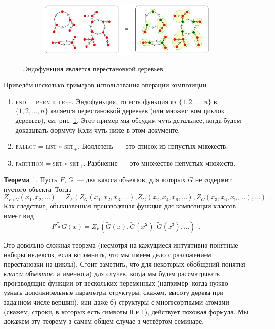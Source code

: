 \documentclass{article}
\theoremstyle{definition}
\newtheorem*{theorem}{Теорема}
\begin{document}
\begin{figure}[h]
\centering
\begin{subfigure}{.8\textwidth}
    \centering
    \includegraphics[width=\textwidth]{par_composition.png}
\end{subfigure}%
\caption{Эндофункция является перестановкой деревьев}
\label{fig:composition}	
\end{figure}

Приведём несколько примеров использования операции композиции.
\begin{enumerate}
    \item \textsc{end} = \textsc{perm} \( \circ \) \textsc{tree}. Эндофункция,
то есть функция из \(
 \{1,2,\ldots, n\}\) в \( \{1,2,\ldots, n\} \) является перестановкой деревьев (или множеством циклов
деревьев), см. рис. \ref{fig:composition}. Этот пример мы обсудим чуть
детальнее, когда будем доказывать формулу Кэли чуть ниже в этом документе.
    \item \textsc{ballot} = \textsc{list} \( \circ \) \textsc{set}$_+$.
Бюллетень~--- это список из непустых множеств.
    \item \textsc{partition} = \textsc{set} \( \circ \) \textsc{set}$_+$.
Разбиение~--- это множество непустых множеств.
\end{enumerate}

\begin{theorem}
	Пусть \( F \), \( G \)~--- два класса объектов, для 
	которых \( G \) не содержит пустого объекта. Тогда
	\[
		Z_{F \circ G}(x_1, x_2, \ldots) = Z_F(
			Z_G(x_1, x_2, x_3, \ldots),
			Z_G(x_2, x_4, x_6, \ldots),
            Z_G(x_3, x_6, x_9, \ldots),
			\ldots
		) \enspace .
	\]
	Как следствие, обыкновенная производящая функция для композиции классов имеет вид
	\[
		\widetilde{F \circ G}(x) = Z_F(\widetilde G(x), \widetilde G(x^2), 
		\widetilde G(x^3), \ldots)
		\enspace .
	\]
\end{theorem}
Это довольно сложная теорема (несмотря на кажущиеся интуитивно понятные наборы
индексов, если вспомнить, что мы имеем дело с разложением перестановки на циклы).
Стоит заметить, что для некоторых обобщений понятия \textit{класса объектов}, а именно
а) для случев, когда мы будем рассматривать производящие функции от нескольких
переменных (например, когда нужно узнать дополнительные параметры структуры,
скажем, высоту дерева при заданном числе вершин), или даже б) структуры с
многосортными атомами
(скажем, строки, в которых есть символы 0 и 1), действует похожая формула.
Мы докажем эту теорему в самом общем случае в четвёртом семинаре.
\end{document}
